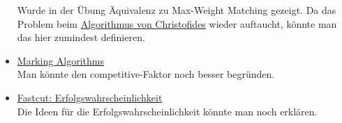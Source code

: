 \documentclass{panikzettel}
\begin{document}
\begin{itemize}
    Wurde in der Übung Äquivalenz zu Max-Weight Matching gezeigt. Da das Problem beim \hyperref[algo:tsp-15-approx]{Algorithmus von Christofides} wieder auftaucht, könnte man das hier zumindest definieren.
    \item\label{mrExp:marking-comp}\hyperlink{mr:marking-comp}{Marking Algorithms}    \\
    Man könnte den competitive-Faktor noch besser begründen.
    \item\label{mrExp:fastcut-ewkeit}\hyperlink{mr:fastcut-ewkeit}{Fastcut: Erfolgswahrscheinlichkeit}    \\
    Die Ideen für die Erfolgswahrscheinlichkeit könnte man noch erklären.
\end{itemize}
\end{document}

